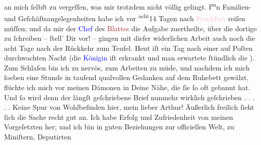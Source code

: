 \documentclass[twoside=false,titlepage=false,open=any, parskip=never, fontsize=12pt, headings=small, chapterprefix=false, appendixprefix=false]{scrbook}
\newcommand{\dotsfive}{%
.\kern\ellipsisgap 
.\kern\ellipsisgap
.\kern\ellipsisgap
.\kern\ellipsisgap 
.\kern\ellipsisgap 
\relax}
\newcommand{\Theight}{\dimexpr\fontcharht\font`W}
\newcommand{\pbposition}{\depth}
\newcommand{\pb}{\nobreak\hspace{0pt}\raisebox{-0.1em}{\raisebox{\pbposition}{\textnormal{|}}}\nobreak\hspace{0pt}}
\newcommand{\substVorne}{\textnormal{\raisebox{\Theight}{\raisebox{-\height}{\rotatebox[origin=c]{180}{v}\normalsize}}}}
\newcommand{\substDazwischen}{}
\newcommand{\substHinten}{\textnormal{\raisebox{\Theight}{\raisebox{-\height}{\small{v}\normalsize}}}}
\begin{document}
               an mich ſelbſt zu vergeſſen, was mir trotzdem nicht völlig gelingt. I\substVorne{}\textsuperscript{m}\substDazwischen{}n\substHinten{} Familien- und Geſchäftsangelegenheiten habe ich vor \substVorne{}\textsuperscript{acht}\substDazwischen{}14\substHinten{} Tagen nach \textcolor{pink}{Frankfurt}{}\ledrightnote{\textcolor{pink}{Frankfurt am Main}} reiſen müſſen; und
               da mir der \textcolor{blue}{Chef}{} des \textcolor{brown}{Blattes}{} die Aufgabe zuertheilte,
               über die dortige \label{K_L02668-1v}\label{K_L02668-1h} zu ſchreiben – ſtell’ Dir vor! – gingen mit dieſer
               widerlichen Arbeit auch noch die acht Tage nach der Rückkehr zum Teufel. Heut iſt ein Tag nach einer auf Poſten durchwachten Nacht
               (die \textcolor{blue}{Königin}{} iſt erkrankt
               und man erwartete ſtündlich die \label{K_L02668-77v}\label{K_L02668-77h}). Zum Schlafen bin ich zu nervös,
               zum Arbeiten zu müde, {\pb}und nachdem ich mich ſoeben
               eine Stunde in tauſend qualvollen Gedanken auf dem Ruhebett gewälzt, flüchte ich mich
               vor meinen Dämonen in Deine Nähe, die ſie ſo oft gebannt hat. Und ſo wird denn der
               längſt geſchriebene Brief nunmehr wirklich geſchrieben{\dotsfive}\pend
           \pstart
           Keine Spur von Wohlbefinden hier, mein lieber Arthur! Äußerlich freilich ſieht ſich
               die Sache recht gut an. Ich habe Erfolg und Zufriedenheit von meinen Vorgeſetzten
               her; und ich bin in guten Beziehungen zur officiellen Welt, zu Miniſtern, Deputirten
\end{document}
